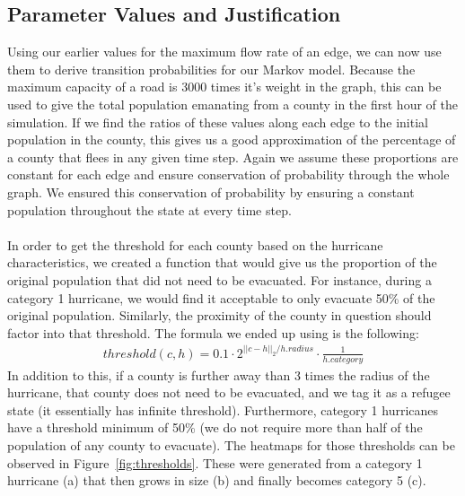 \documentclass[titlepage]{article}
\begin{document}
  \subsection{Parameter Values and Justification}
    Using our earlier values for the maximum flow rate of an edge, we can now use them to derive transition probabilities for our Markov model. Because the maximum capacity of a road is 3000 times it's weight in the graph, this can be used to give the total population emanating from a county in the first hour of the simulation. If we find the ratios of these values along each edge to the initial population in the county, this gives us a good approximation of the percentage of a county that flees in any given time step. Again we assume these proportions are constant for each edge and ensure conservation of probability through the whole graph. We ensured this conservation of probability by ensuring a constant population throughout the state at every time step.\\
    \\
    In order to get the threshold for each county based on the hurricane characteristics, we created a function that would give us the proportion of the original population that did not need to be evacuated. For instance, during a category 1 hurricane, we would find it acceptable to only evacuate 50\% of the original population. Similarly, the proximity of the county in question should factor into that threshold.
    The formula we ended up using is the following:
    \begin{align*}
        threshold(c, h) = 0.1 \cdot 2^{||c-h||_2 / h.radius} \cdot \frac{1}{h.category}
    \end{align*}
    In addition to this, if a county is further away than 3 times the radius of the hurricane, that county does not need to be evacuated, and we tag it as a refugee state (it essentially has infinite threshold). Furthermore, category 1 hurricanes have a threshold minimum of 50\% (we do not require more than half of the population of any county to evacuate).
    The heatmaps for those thresholds can be observed in Figure~\ref{fig:thresholds}. These were generated from a category 1 hurricane (a) that then grows in size (b) and finally becomes category 5 (c).
\end{document}
